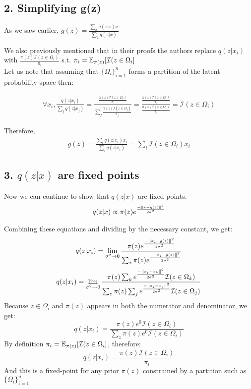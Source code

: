 \subsection*{2. Simplifying g(z)}
As we saw earlier, $g(z)=\frac{\sum_{x}{q(z|x) x}}{\sum_{x}{q(z|x)}}$

We also previously mentioned that in their proofs the authors replace $q(z|x_{i})$ with $\frac{\pi(z)\mathcal{I}({z\in\Omega_{i}})}{\pi_{i}}$ s.t. $\pi_{i} = \operatorname{\mathbb{E}}_{\pi(z)}[\mathcal{I}(z\in\Omega_{i}]$\\
Let us note that assuming that $\lbrace{{\Omega_i}\rbrace}_{i=1}^n$ forms a partition of the latent probability space then:

\begin{gather*}
\forall x_i, \frac{q(z|x_i)}{\sum_j q(z|x_j)} = \frac{\frac{\pi(z)\mathcal{I}({z\in\Omega_{i}})}{\pi_{i}}}{\sum_j \frac{\pi(z)\mathcal{I}({z\in\Omega_{j}})}{\pi_{j}}} = \frac{\frac{\pi(z)\mathcal{I}({z\in\Omega_{i}})}{\pi_{i}}}{\frac{\pi(z)\mathcal{I}({z\in\Omega_{i}})}{\pi_{i}}} = \mathcal{I}(z\in\Omega_i)
\end{gather*}

Therefore,
\begin{gather*}
g(z)=\frac{\sum_{i}{q(z|x_i) x_i}}{\sum_{i}{q(z|x_i)}} = \sum_i \mathcal{I}(z\in\Omega_i)x_i
\end{gather*}

\subsection*{3. $q(z|x)$ are fixed points}
Now we can continue to show that $q(z|x)$ are fixed points.\\

\begin{gather*}
q(z|x) \propto \pi(z)e^\frac{-\left\lVert x-g(z)\right\rVert^2}{2\sigma^2}
\end{gather*}

Combining these equations and dividing by the necessary constant, we get:
\setcounter{equation}{0}
\begin{equation}
q(z|x_i) = \lim_{\sigma^2\to0}\frac{\pi(z)e^\frac{-\left\lVert x_i-g(z)\right\rVert^2}{2\sigma^2}}{\sum_z\pi(z)e^\frac{-\left\lVert x_i-g(z)\right\rVert^2}{2\sigma^2}}
\end{equation}
\begin{equation}
q(z|x_i) = \lim_{\sigma^2\to0}\frac{\pi(z)\sum_k e^\frac{-\left\lVert x_i- x_k\right\rVert^2}{2\sigma^2}\mathcal{I}(z\in\Omega_k)}{\sum_z\pi(z)\sum_j e^\frac{-\left\lVert x_i- x_j\right\rVert^2}{2\sigma^2}\mathcal{I}(z\in\Omega_j)}
\end{equation}
Because $z\in\Omega_i$ and $\pi(z)$ appears in both the numerator and denominator, we get:
\begin{equation}
q(z|x_i) = \frac{\pi(z) e^0 \mathcal{I}(z\in\Omega_i)}{\sum_z\pi(z) e^0 \mathcal{I}(z\in\Omega_i)}
\end{equation}
By definition $\pi_{i} = \operatorname{\mathbb{E}}_{\pi(z)}[\mathcal{I}(z\in\Omega_{i}]$, therefore:
\begin{equation}
q(z|x_i) = \frac{\pi(z)\mathcal{I}(z\in\Omega_i)}{\pi_i}
\end{equation}
And this is a fixed-point for any prior $\pi(z)$ constrained by a partition such as $\lbrace{{\Omega_i}\rbrace}_{i=1}^n$

